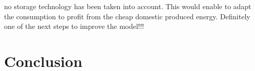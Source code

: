 \documentclass{article}
\begin{document}
 no storage technology has been taken into account. This would enable to adapt the consumption to profit from the cheap domestic produced energy. Definitely one of the next steps to improve the model!!!
 
 
\section{Conclusion}


\clearpage


\clearpage



\end{document}
